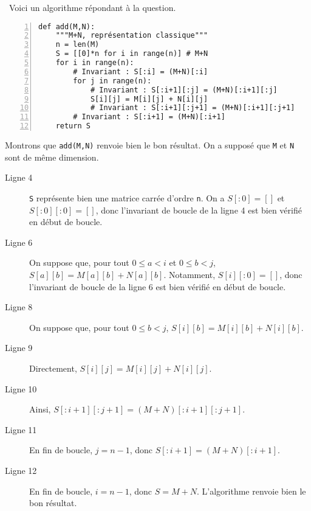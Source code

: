 \exer{}
\setcounter{numques}{0}

\question\
Voici un algorithme répondant à la question. 
\begin{Verbatim}[gobble=0,numbers=left]
def add(M,N):
    """M+N, représentation classique"""
    n = len(M)
    S = [[0]*n for i in range(n)] # M+N
    for i in range(n):
        # Invariant : S[:i] = (M+N)[:i]
        for j in range(n):
            # Invariant : S[:i+1][:j] = (M+N)[:i+1][:j]
            S[i][j] = M[i][j] + N[i][j]
            # Invariant : S[:i+1][:j+1] = (M+N)[:i+1][:j+1]
        # Invariant : S[:i+1] = (M+N)[:i+1]
    return S
\end{Verbatim}
Montrons que \texttt{add(M,N)} renvoie bien le bon résultat. On a supposé que \texttt{M} et \texttt{N} sont de même dimension. 
\begin{description}
  \item[Ligne 4] \texttt{S} représente bien une matrice carrée d'ordre \texttt{n}. On a $S[:0] = []$ et $S[:0][:0] = []$, donc l'invariant de boucle de la ligne 4 est bien vérifié en début de boucle.
  \item[Ligne 6] On suppose que, pour tout $0\leq a < i$ et $0\leq b < j$, $S[a][b] = M[a][b] + N[a][b]$. Notamment, $S[i][:0] = []$, donc l'invariant de boucle de la ligne 6 est bien vérifié en début de boucle. 
  \item[Ligne 8] On suppose que, pour tout $0\leq b < j$, $S[i][b] = M[i][b] + N[i][b]$. 
  \item[Ligne 9] Directement, $S[i][j] = M[i][j] + N[i][j]$.
  \item[Ligne 10] Ainsi, $S[:i+1][:j+1] = (M+N)[:i+1][:j+1]$.
  \item[Ligne 11] En fin de boucle, $j = n-1$, donc $S[:i+1] = (M+N)[:i+1]$.
  \item[Ligne 12] En fin de boucle, $i = n-1$, donc $S = M+N$. L'algorithme renvoie bien le bon résultat.
\end{description}

